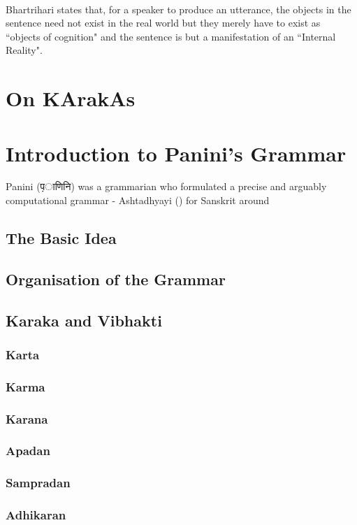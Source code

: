 \documentclass[a4paper,10pt]{article}
\begin{document}
\paragraph{} Bhartrihari states that, for a speaker to produce an utterance, the objects in the sentence need not 
exist in the real world but they merely have to exist as ``objects of cognition" and the sentence is but a manifestation of an ``Internal Reality".



\section{On KArakAs}


\newpage
\section{Introduction to Panini's Grammar}
Panini ({\d पाणिनि}) was a grammarian who formulated a precise and arguably computational grammar - Ashtadhyayi () for Sanskrit around 
\subsection{The Basic Idea}
\subsection{Organisation of the Grammar}
\subsection{Karaka and Vibhakti}
\subsubsection{Karta}
\subsubsection{Karma}
\subsubsection{Karana}
\subsubsection{Apadan}
\subsubsection{Sampradan}
\subsubsection{Adhikaran}
\end{document}
